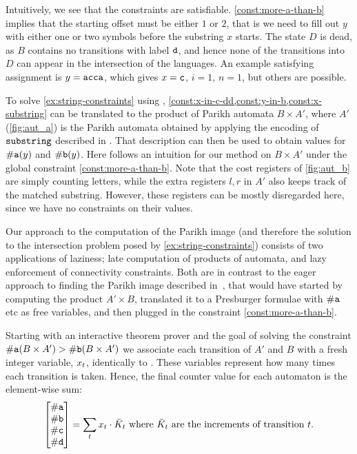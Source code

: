 Intuitively, we see that the constraints are satisfiable.
\cref{const:more-a-than-b} implies that the starting offset must be either $1$
or $2$, that is we need to fill out $y$ with either one or two symbols before
the substring $x$ starts. The state $D$ is dead, as $B$ contains no transitions
with label $\texttt{d}$, and hence none of the transitions into $D$ can appear in
the intersection of the languages. An example satisfying assignment is $y =
\texttt{acca}$, which gives $x = \texttt{c}$, $i = 1$, $n = 1$, but others are
possible.

To solve \cref{ex:string-constraints} using \Calculus{},
\cref{const:x-in-c-dd,const:y-in-b,const:x-substring} can be translated to the
product of Parikh automata $B \times A'$, where $A'$ (\cref{fig:aut_a}) is the
Parikh automata obtained by applying the encoding of $\operatorname{\mathtt{substring}}$ described in
\cite{ostrich-plus}. That description can then be used to obtain values for
$\#\text{\texttt{a}}(y)$ and $\#\text{\texttt{b}}(y)$. Here follows an intuition
for our method on $B \times A'$ under the global constraint
\cref{const:more-a-than-b}. Note that the cost registers of \cref{fig:aut_b} are
simply counting letters, while the extra registers $l, r$ in $A'$ also keeps
track of the matched substring. However, these registers can be mostly
disregarded here, since we have no constraints on their values.

Our approach to the computation of the Parikh image (and therefore the solution
to the intersection problem posed by \cref{ex:string-constraints}) consists of
two applications of laziness; late computation of products of automata, and lazy
enforcement of connectivity constraints. Both are in contrast to the eager
approach to finding the Parikh image described in~\cite{generate-parikh-image},
that would have started by computing the product $A' \times B$, translated it to
a Presburger formulae with $\#\text{\texttt{a}}$ etc as free variables, and then
plugged in the constraint \cref{const:more-a-than-b}.

Starting with an interactive theorem prover and the goal of solving the
constraint $\#\text{\texttt{a}}(B \times A') > \#\text{\texttt{b}}(B \times A')$
we associate each transition of $A'$ and $B$ with a fresh integer variable,
$x_t$, identically to \cite{generate-parikh-image}. These
variables represent how many times each transition is taken. Hence, the final
counter value for each automaton is the element-wise sum:
\begin{equation}
\begin{bmatrix} 
  \#\text{\texttt{a}} \\ \#\text{\texttt{b}} 
  \\ \#\text{\texttt{c}} \\ \#\text{\texttt{d}} 
\end{bmatrix} = \sum_t x_t \cdot 
  \bar{K}_t \text{ where $\bar{K}_t$ are the increments of transition $t$}.
\end{equation}

